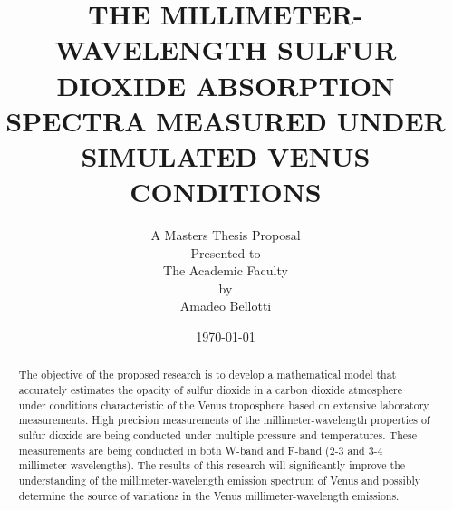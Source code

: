 \documentclass[11pt]{article}
\title{THE MILLIMETER-WAVELENGTH SULFUR DIOXIDE ABSORPTION SPECTRA MEASURED UNDER SIMULATED VENUS CONDITIONS }
\author{A Masters Thesis Proposal\\
Presented to\\
The Academic Faculty \\
by \\
Amadeo Bellotti}
\date{\mydate\today} %
\begin{document}
\maketitle

\begin{abstract}
The objective of the proposed research is to develop a mathematical model that accurately estimates the opacity of sulfur dioxide in a carbon dioxide atmosphere under conditions characteristic of the Venus troposphere based on extensive laboratory measurements. High precision measurements of the millimeter-wavelength properties of sulfur dioxide are being conducted under multiple pressure and temperatures. These measurements are being conducted in both W-band and F-band (2-3 and 3-4 millimeter-wavelengths). The results of this research will significantly improve the understanding of the millimeter-wavelength emission spectrum of Venus and possibly determine the source of variations in the Venus millimeter-wavelength emissions. 
\end{abstract}
\newpage





\newpage

 

\end{document}

